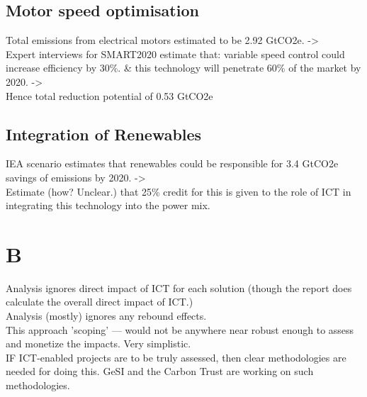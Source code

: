 \documentclass[11pt, twocolumn]{article}
\begin{document}
\subsection{Motor speed optimisation}
Total emissions from electrical motors estimated to be 2.92 GtCO2e. ->\\
Expert interviews for SMART2020 estimate that: variable speed control could increase efficiency by 30\%. \& this technology will penetrate 60\% of the market by 2020. ->\\
Hence total reduction potential of 0.53 GtCO2e
\subsection{Integration of Renewables}
IEA scenario estimates that renewables could be responsible for 3.4 GtCO2e savings of emissions by 2020. ->\\
Estimate (how? Unclear.) that 25\% credit for this is given to the role of ICT in integrating this technology into the power mix.

\section{B}

Analysis ignores direct impact of ICT for each solution (though the report does calculate the overall direct impact of ICT.)\\

Analysis (mostly) ignores any rebound effects.\\

This approach 'scoping' --- would not be anywhere near robust enough to assess and monetize the impacts. Very simplistic.\\

IF ICT-enabled projects are to be truly assessed, then clear methodologies are needed for doing this. GeSI and the Carbon Trust are working on such methodologies.\\
















\newpage
\end{document}
